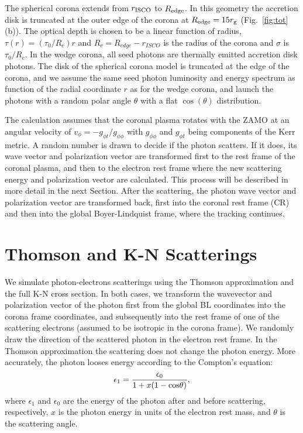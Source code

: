 \documentclass[manuscript]{aastex}
\begin{document}
The spherical corona extends from $r_{\rm ISCO}$ to $R_{\rm edge}$. 
In this geometry the accretion disk is truncated at the outer edge of the corona at 
$R_{\rm edge}=15 r_{\rm g}$ (Fig.~\ref{fig:tot} (b)). The optical depth is chosen to be a 
linear function of radius, $\tau(r)=(\tau_0/R_c)r$ and $R_c=R_{edge}-r_{ISCO}$ is the radius of the corona and $\sigma$ is $\tau_0/R_c$. In the wedge corona, all seed photons are thermally emitted accretion disk photons. The disk of the spherical corona model is truncated at the edge of the corona, and we assume the same seed photon luminosity and energy spectrum as function of the radial coordinate $r$ as for the wedge corona, and launch the photons with a random polar angle $\theta$ with a flat $\cos{(\theta)}$ distribution.
 
The calculation assumes that the coronal plasma rotates with the ZAMO at an angular velocity of 
$v_{\phi}=-g_{\phi t}/g_{\phi\phi}$ with $g_{\phi\phi}$ and $g_{\phi t}$ being components of the Kerr metric. 
A random number is drawn to decide if the photon scatters. If it does, its wave vector and polarization vector 
are transformed first to the rest frame of the coronal plasma, and then to the electron rest frame 
where the new scattering energy and  polarization vector are calculated.  This process will be described in more detail in the next Section.  After the scattering, the photon wave vector and polarization vector are transformed back, first into the coronal rest frame (CR)  and then into the global Boyer-Lindquist frame, where the tracking continues.
%
\section{Thomson and K-N Scatterings}\label{kn}
We simulate photon-electrons scatterings using the Thomson approximation and the full K-N cross section. 
In both cases, we transform the wavevector and polarization vector of the photon 
first from the global BL coordinates into the corona frame coordinates, 
and subsequently into the rest frame of one of the scattering 
electrons (assumed to be isotropic in the corona frame). We randomly draw the direction of the scattered photon in the electron rest frame. In the Thomson approximation the scattering does not change the photon energy.
More accurately, the photon looses energy according to the Compton's equation:
\begin{equation}\label{a}
\epsilon_1=\frac{\epsilon_0}{1+x(1-{\rm cos}\theta)},
\end{equation}
where $\epsilon_1$ and $\epsilon_0$ are the energy of the photon after and before scattering, respectively, 
$x$ is the photon energy in units of the electron rest mass, and $\theta$ is the scattering angle. 
\end{document}
